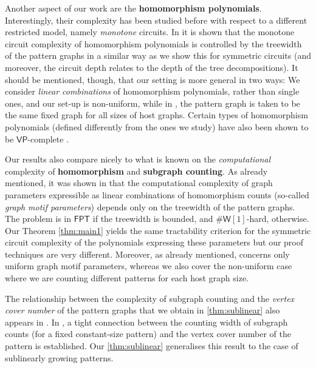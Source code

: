 \documentclass[10pt,a4paper]{article}
\theoremstyle{definition}
\theoremstyle{plain}
\theoremstyle{remark}
\newcommand{\VP}{\mathsf{VP}}
\begin{document}
Another aspect of our work are the \textbf{homomorphism polynomials}. Interestingly, their complexity has been studied before with respect to a different restricted model, namely \emph{monotone} circuits. In \cite{KomarathPR23, PrateekRadu25} it is shown that the monotone circuit complexity of homomorphism polynomials is controlled by the treewidth of the pattern graphs in a similar way as we show this for symmetric circuits (and moreover, the circuit depth relates to the depth of the tree decompositions). It should be mentioned, though, that our setting is more general in two ways: We consider \emph{linear combinations} of homomorphism polynomials, rather than single ones, and our set-up is non-uniform, while in \cite{KomarathPR23, PrateekRadu25}, the pattern graph is taken to be the same fixed graph for all sizes of host graphs. 
Certain types of homomorphism polynomials (defined differently from the ones we study) have also been shown to be $\VP$-complete \cite{durand2014homomorphism}.

Our results also compare nicely to what is known on the \emph{computational} complexity of \textbf{homomorphism} and  \textbf{subgraph counting}. 
As already mentioned, it was shown in \cite{curticapean_homomorphisms_2017} that the computational complexity of graph parameters expressible as linear combinations of homomorphism counts (so-called \emph{graph motif parameters}) depends only on the treewidth of the pattern graphs. The problem is in $\mathsf{FPT}$ if the treewidth is bounded, and $\mathsf{\# W}[1]$-hard, otherwise. 
Our Theorem \ref{thm:main1} yields the same tractability criterion for the symmetric circuit complexity of the polynomials expressing these parameters but our proof techniques are very different. 
Moreover, as already mentioned, \cite{curticapean_homomorphisms_2017} concerns only uniform graph motif parameters, whereas we also cover the non-uniform case where we are counting different patterns for each host graph size.


The relationship between the complexity of subgraph counting and the \emph{vertex cover number} of the pattern graphs that we obtain in \cref{thm:sublinear} also appears in \cite{curticapean_homomorphisms_2017}. In \cite[Theorem 1.3]{neuen_homomorphism-distinguishing_2024}, a tight connection between the counting width of subgraph counts (for a fixed constant-size pattern) and the vertex cover number of the pattern is established. 
Our  \cref{thm:sublinear} generalises this result to the case of sublinearly growing patterns. 
\end{document}
